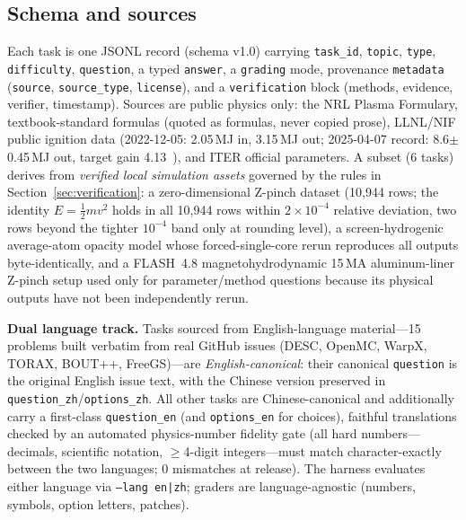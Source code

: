 \subsection{Schema and sources}
Each task is one JSONL record (schema v1.0) carrying \texttt{task\_id}, \texttt{topic}, \texttt{type}, \texttt{difficulty}, \texttt{question}, a typed \texttt{answer}, a \texttt{grading} mode, provenance \texttt{metadata} (\texttt{source}, \texttt{source\_type}, \texttt{license}), and a \texttt{verification} block (methods, evidence, verifier, timestamp). Sources are public physics only: the NRL Plasma Formulary, textbook-standard formulas (quoted as formulas, never copied prose), LLNL/NIF public ignition data (2022-12-05: 2.05\,MJ in, 3.15\,MJ out; 2025-04-07 record: 8.6$\pm$0.45\,MJ out, target gain 4.13~\cite{llnl2025record}), and ITER official parameters. A subset (6 tasks) derives from \emph{verified local simulation assets} governed by the rules in Section~\ref{sec:verification}: a zero-dimensional Z-pinch dataset (10{,}944 rows; the identity $E=\tfrac12 mv^2$ holds in all 10{,}944 rows within $2\times10^{-4}$ relative deviation, two rows beyond the tighter $10^{-4}$ band only at rounding level), a screen-hydrogenic average-atom opacity model whose forced-single-core rerun reproduces all outputs byte-identically, and a FLASH~4.8 magnetohydrodynamic 15\,MA aluminum-liner Z-pinch setup used only for parameter/method questions because its physical outputs have not been independently rerun.

\textbf{Dual language track.} Tasks sourced from English-language material---15 problems built verbatim from real GitHub issues (DESC, OpenMC, WarpX, TORAX, BOUT++, FreeGS)---are \emph{English-canonical}: their canonical \texttt{question} is the original English issue text, with the Chinese version preserved in \texttt{question\_zh}/\texttt{options\_zh}. All other tasks are Chinese-canonical and additionally carry a first-class \texttt{question\_en} (and \texttt{options\_en} for choices), faithful translations checked by an automated physics-number fidelity gate (all hard numbers---decimals, scientific notation, $\geq$4-digit integers---must match character-exactly between the two languages; 0 mismatches at release). The harness evaluates either language via \texttt{--lang en|zh}; graders are language-agnostic (numbers, symbols, option letters, patches).

